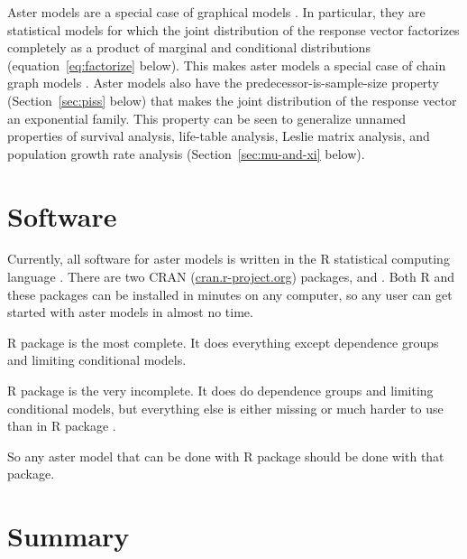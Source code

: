 Aster models are a special case of graphical models \citep{lauritzen}.
In particular, they are statistical models for which the joint distribution
of the response vector factorizes completely as a product of marginal and
conditional distributions (equation~\eqref{eq:factorize} below).
This makes aster models a special case of chain graph models
\citep[Sections~2.1.1 and~3.2.3]{lauritzen}.
Aster models also have the predecessor-is-sample-size property
(Section~\ref{sec:piss} below)
that makes the joint distribution of the response vector an exponential
family.  This property can be seen to generalize unnamed properties
of survival analysis, life-table analysis, Leslie matrix analysis,
and population growth rate analysis (Section~\ref{sec:mu-and-xi} below).

\section{Software}
\label{sec:software}

Currently, all software for aster models is written in the R statistical
computing language \citep{r-core}.  There are two CRAN
(\url{cran.r-project.org}) packages,  \citep{aster-package} and
 \citep{aster2-package}.
Both R and these packages can be installed in minutes on any computer,
so any user can get started with aster models in almost no time.

R package  is the most complete.
It does everything except dependence groups
and limiting conditional models.

R package  is the very incomplete.
It does do dependence groups and limiting conditional models, but everything
else is either missing or much harder to use than in R package .

So any aster model that can be done with R package  should
be done with that package.

\section{Summary}

